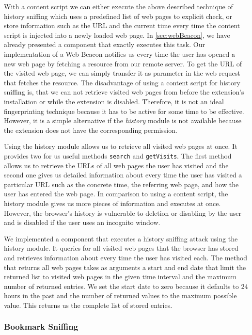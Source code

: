 	With a content script we can either execute the above described technique of history sniffing which uses a predefined list of web pages to explicit check, or store information such as the URL and the current time every time the content script is injected into a newly loaded web page. In \autoref{sec:webBeacon}, we have already presented a component that exactly executes this task. Our implementation of a Web Beacon notifies us every time the user has opened a new web page by fetching a resource from our remote server. To get the URL of the visited web page, we can simply transfer it as parameter in the web request that fetches the resource. The disadvantage of using a content script for history sniffing is, that we can not retrieve visited web pages from before the extension's installation or while the extension is disabled. Therefore, it is not an ideal fingerprinting technique because it has to be active for some time to be effective. However, it is a simple alternative if the \textit{history} module is not available because the extension does not have the corresponding permission.
	
	Using the history module allows us to retrieve all visited web pages at once. It provides two for us useful methods \texttt{search} and \texttt{getVisits}. The first method allows us to retrieve the URLs of all web pages the user has visited and the second one gives us detailed information about every time the user has visited a particular URL such as the concrete time, the referring web page, and how the user has entered the web page. In comparison to using a content script, the history module gives us more pieces of information and executes at once. However, the browser's history is vulnerable to deletion or disabling by the user and is disabled if the user uses an incognito window.
	
	We implemented a component that executes a history sniffing attack using the history module. It queries for all visited web pages that the browser has stored and retrieves information about every time the user has visited each. The method that returns all web pages takes as arguments a start and end date that limit the returned list to visited web pages in the given time interval and the maximum number of returned entries. We set the start date to zero because it defaults to 24 hours in the past and the number of returned values to the maximum possible value. This returns us the complete list of stored entries.
	
\subsubsection{Bookmark Sniffing}
\label{sec:bookmarkSniffing}

